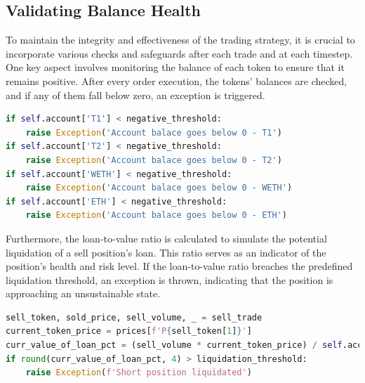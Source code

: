 \subsection{Validating Balance Health}
To maintain the integrity and effectiveness of the trading strategy, it is crucial to incorporate various checks and safeguards after each trade and at each timestep. One key aspect involves monitoring the balance of each token to ensure that it remains positive. After every order execution, the tokens' balances are checked, and if any of them fall below zero, an exception is triggered.
\begin{lstlisting}[language=Python]
if self.account['T1'] < negative_threshold:
    raise Exception('Account balace goes below 0 - T1')
if self.account['T2'] < negative_threshold:
    raise Exception('Account balace goes below 0 - T2')
if self.account['WETH'] < negative_threshold:
    raise Exception('Account balace goes below 0 - WETH')
if self.account['ETH'] < negative_threshold:
    raise Exception('Account balace goes below 0 - ETH')
\end{lstlisting}   
Furthermore, the loan-to-value ratio is calculated to simulate the potential liquidation of a sell position's loan. This ratio serves as an indicator of the position's health and risk level. If the loan-to-value ratio breaches the predefined liquidation threshold, an exception is thrown, indicating that the position is approaching an unsustainable state.
\begin{lstlisting}[language=Python]
sell_token, sold_price, sell_volume, _ = sell_trade
current_token_price = prices[f'P{sell_token[1]}']
curr_value_of_loan_pct = (sell_volume * current_token_price) / self.account['collateral_WETH']
if round(curr_value_of_loan_pct, 4) > liquidation_threshold:
    raise Exception(f'Short position liquidated')
\end{lstlisting}

